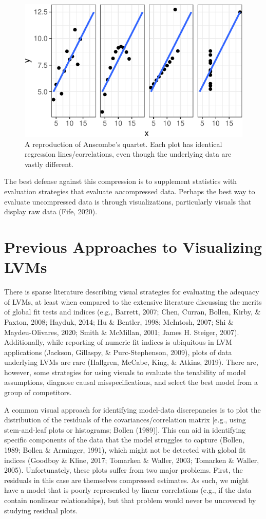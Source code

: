 \documentclass[
  english,
  man]{apa6}
\begin{document}
\begin{figure}

{\centering \includegraphics[width=0.5\linewidth]{flexplavaan_draft_files/figure-latex/anscombe-1} 

}

\caption{A reproduction of Anscombe's quartet. Each plot has identical regression lines/correlations, even though the underlying data are vastly different.}\label{fig:anscombe}
\end{figure}

The best defense against this compression is to supplement statistics with evaluation strategies that evaluate \emph{un}compressed data. Perhaps the best way to evaluate uncompressed data is through visualizations, particularly visuals that display raw data (Fife, 2020).

\hypertarget{previous-approaches-to-visualizing-lvms}{%
\section{Previous Approaches to Visualizing LVMs}\label{previous-approaches-to-visualizing-lvms}}

There is sparse literature describing visual strategies for evaluating the adequacy of LVMs, at least when compared to the extensive literature discussing the merits of global fit tests and indices (e.g., Barrett, 2007; Chen, Curran, Bollen, Kirby, \& Paxton, 2008; Hayduk, 2014; Hu \& Bentler, 1998; McIntosh, 2007; Shi \& Maydeu-Olivares, 2020; Smith \& McMillan, 2001; James H. Steiger, 2007). Additionally, while reporting of numeric fit indices is ubiquitous in LVM applications (Jackson, Gillaspy, \& Purc-Stephenson, 2009), plots of data underlying LVMs are rare (Hallgren, McCabe, King, \& Atkins, 2019). There are, however, some strategies for using visuals to evaluate the tenability of model assumptions, diagnose causal misspecifications, and select the best model from a group of competitors.

A common visual approach for identifying model-data discrepancies is to plot the distribution of the residuals of the covariances/correlation matrix {[}e.g., using stem-and-leaf plots or histograms; Bollen (1989){]}. This can aid in identifying specific components of the data that the model struggles to capture (Bollen, 1989; Bollen \& Arminger, 1991), which might not be detected with global fit indices (Goodboy \& Kline, 2017; Tomarken \& Waller, 2003; Tomarken \& Waller, 2005). Unfortunately, these plots suffer from two major problems. First, the residuals in this case are themselves compressed estimates. As such, we might have a model that is poorly represented by linear correlations (e.g., if the data contain nonlinear relationships), but that problem would never be uncovered by studying residual plots.
\end{document}
